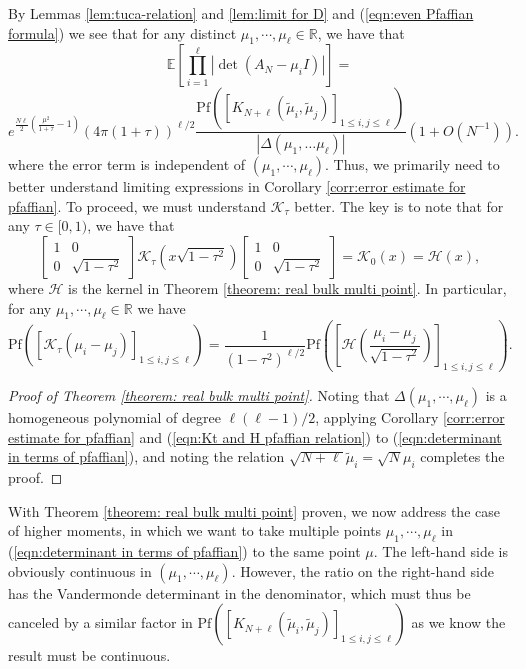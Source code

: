 \documentclass[12pt]{article}
\newcommand{\R}{\mathbb{R}}
\newcommand{\E}{\mathbb{E}}
\numberwithin{info}{section}
\numberwithin{equation}{section}
\renewcommand{\[}{\begin{equation}}
\renewcommand{\]}{\end{equation}}
\renewcommand{\cal}{\mathcal}
\newcommand{\<}{\langle}
\renewcommand{\>}{\rangle}
\newcommand{\pf}{\mathrm{Pf}}
\renewcommand{\l}{\left}
\renewcommand{\r}{\right}
\begin{document}
	By Lemmas \ref{lem:tuca-relation} and \ref{lem:limit for D} and (\ref{eqn:even Pfaffian formula}) we see that for any distinct $\mu_1,\cdots,\mu_\ell\in \R$, we have that
	\[\E\left[\prod_{i=1}^{\ell}|\det(A_N-\mu_iI)|\right]=\]\[e^{\frac{N \ell}{2} \left(\frac{\mu^2}{1+\tau}-1\right)}\left(4\pi (1+\tau)\right)^{\ell/2}\frac{\pf(\l[K_{N+\ell}\l(\tilde{\mu}_i,\tilde{\mu}_j\r)\r]_{1\le i,j\le \ell})}{|\Delta(\mu_1,\dots \mu_\ell)|}\l(1+O\left(N^{-1}\right)\r).\label{eqn:determinant in terms of pfaffian}\]
	where the error term is independent of $(\mu_1,\cdots,\mu_\ell)$. Thus, we primarily need to better understand limiting expressions in Corollary \ref{corr:error estimate for pfaffian}. To proceed, we must understand $\cal{K}_\tau$ better. The key is to note that for any $\tau\in [0,1)$, we have that
	\[\begin{bmatrix}1 & 0\\ 0 & \sqrt{1-\tau^2} \end{bmatrix}\cal{K}_{\tau}\left(x\sqrt{1-\tau^2}\right)\begin{bmatrix}1 & 0\\ 0 & \sqrt{1-\tau^2} \end{bmatrix}=\cal{K}_{0}(x)=\cal{H}(x),\]
	where $\cal{H}$ is the kernel in Theorem \ref{theorem: real bulk multi point}. In particular, for any $\mu_1,\cdots,\mu_\ell\in \R$ we have
	\[\pf(\l[\cal{K}_{\tau}\l(\mu_i-\mu_j\r)\r]_{1\le i,j\le \ell})=\frac{1}{(1-\tau^2)^{\ell/2}}\pf\l(\left[\cal{H}\left(\frac{\mu_i-\mu_j}{\sqrt{1-\tau^2}}\right)\r]_{1\le i,j\le \ell}\r).\label{eqn:Kt and H pfaffian relation}\]
	
	\begin{proof}[Proof of Theorem \ref{theorem: real bulk multi point}]
		Noting that $\Delta(\mu_1,\cdots,\mu_\ell)$ is a homogeneous polynomial of degree $\ell(\ell-1)/2$, applying Corollary \ref{corr:error estimate for pfaffian} and (\ref{eqn:Kt and H pfaffian relation}) to (\ref{eqn:determinant in terms of pfaffian}), and noting the relation $\sqrt{N+\ell}\tilde{\mu}_i=\sqrt{N}\mu_i$ completes the proof.
	\end{proof}
	
	With Theorem \ref{theorem: real bulk multi point} proven, we now address the case of higher moments, in which we want to take multiple points $\mu_1,\cdots,\mu_\ell$ in (\ref{eqn:determinant in terms of pfaffian}) to the same point $\mu$. The left-hand side is obviously continuous in $(\mu_1,\cdots, \mu_\ell)$. However, the ratio on the right-hand side has the Vandermonde determinant in the denominator, which must thus be canceled by a similar factor in $\pf(\l[K_{N+\ell}\l(\tilde{\mu}_i,\tilde{\mu}_j\r)\r]_{1\le i,j\le \ell})$ as we know the result must be continuous. 
	
\end{document}
